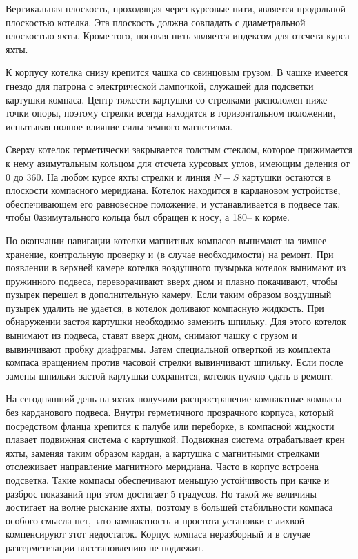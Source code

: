 Вертикальная плоскость, проходящая через курсовые нити, является продольной плоскостью котелка. Эта плоскость должна совпадать с диаметральной плоскостью яхты. Кроме того, носовая нить является индексом для отсчета курса яхты. 

К корпусу котелка снизу крепится чашка со свинцовым грузом. В чашке имеется гнездо для патрона с электрической лампочкой, служащей для подсветки картушки компаса. Центр тяжести картушки со стрелками расположен ниже точки опоры, поэтому стрелки всегда находятся в горизонтальном положении, испытывая полное влияние силы земного магнетизма. 

Сверху котелок герметически закрывается толстым стеклом, которое прижимается к нему азимутальным кольцом для отсчета курсовых углов, имеющим деления от 0 до 360\gr. На любом курсе яхты стрелки и линия $N-S$ картушки остаются в плоскости компасного меридиана. Котелок находится в кардановом устройстве, обеспечивающем его равновесное положение, и устанавливается в подвесе так, чтобы 0\gr азимутального кольца был обращен к носу, а 180\gr \--- к корме. 

По окончании навигации котелки магнитных компасов вынимают на зимнее хранение, контрольную проверку и (в случае необходимости) на ремонт. При появлении в верхней камере котелка воздушного пузырька котелок вынимают из пружинного подвеса, переворачивают вверх дном и плавно покачивают, чтобы пузырек перешел в дополнительную камеру. Если таким образом воздушный пузырек удалить не удается, в котелок доливают компасную жидкость. При обнаружении застоя картушки необходимо заменить шпильку. Для этого котелок вынимают из подвеса, ставят вверх дном, снимают чашку с грузом и вывинчивают пробку диафрагмы. Затем специальной отверткой из комплекта компаса вращением против часовой стрелки вывинчивают шпильку. Если после замены шпильки застой картушки сохранится, котелок нужно сдать в ремонт. 

На сегодняшний день на яхтах получили распространение компактные компасы без карданового подвеса. Внутри герметичного прозрачного корпуса, который посредством фланца крепится к палубе или переборке, в компасной жидкости плавает подвижная система с картушкой. Подвижная система отрабатывает крен яхты, заменяя таким образом кардан, а картушка с магнитными стрелками отслеживает направление магнитного меридиана. Часто в корпус встроена подсветка. Такие компасы обеспечивают меньшую устойчивость при качке и разброс показаний при этом достигает 5 градусов. Но такой же величины достигает на волне рыскание яхты, поэтому в большей стабильности компаса особого смысла нет, зато компактность и простота установки с лихвой компенсируют этот недостаток. Корпус компаса неразборный и в случае разгерметизации восстановлению не подлежит. 

